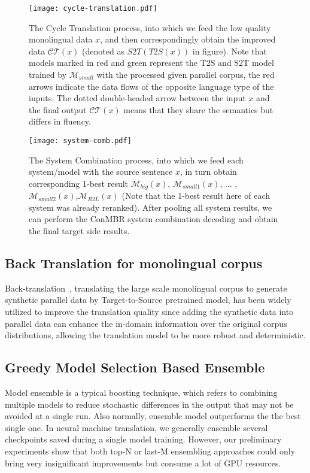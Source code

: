 \documentclass[11pt,a4paper]{article}
\begin{document}
\begin{figure}[ht]
    \centering
    \texttt{[image: cycle-translation.pdf]}
    \caption{The Cycle Translation process, into which we feed the low quality monolingual data $x$, and then correspondingly obtain the improved data $\mathcal{C}\mathcal{T}(x)$ (denoted as $S2T(T2S(x))$ in figure). Note that models marked in red and green represent the T2S and S2T model trained by $\mathcal{M}_{small}$ with the processed given parallel corpus, the red arrows indicate the data flows of the opposite language type of the inputs. The dotted double-headed arrow between the input $x$ and the final output $\mathcal{C}\mathcal{T}(x)$ means that they share the semantics but differs in fluency.}
    \label{fig:cycle-translation}
\end{figure}


\begin{figure}[ht]
    \centering
    \texttt{[image: system-comb.pdf]}
    \caption{The System Combination process, into which we feed each system/model with the source sentence $x$, in turn obtain corresponding 1-best result $\mathcal{M}_{big}(x)$, $\mathcal{M}_{small1}(x)$, ... ,$\mathcal{M}_{small2}(x)$,$\mathcal{M}_{R2L}(x)$ (Note that the 1-best result here of each system was already reranked). After pooling all system results, we can perform the ConMBR system combination decoding and obtain the final target side results.}
    \label{fig:system-comb}
\end{figure}

\subsection{Back Translation for monolingual corpus}

Back-translation~\cite{sennrich2015improving,bojar-etal-2018-findings}, translating the large scale monolingual corpus to generate synthetic parallel data by Target-to-Source pretrained model, has been widely utilized to improve the translation quality since adding the synthetic data into parallel data can enhance the in-domain information over the original corpus distributions, allowing the translation model to be more robust and deterministic.

\subsection{Greedy Model Selection Based Ensemble}
\label{ssec:GMSE}
Model ensemble is a typical boosting technique, which refers to combining multiple models to reduce stochastic differences in the output that may not be avoided at a single run. Also normally, ensemble model outperforms the the best single one. In neural machine translation, we generally ensemble several checkpoints saved during a single model training. However, our preliminary experiments show that both top-N or last-M ensembling approaches could only bring very insignificant improvements but consume a lot of GPU resources.
\end{document}
